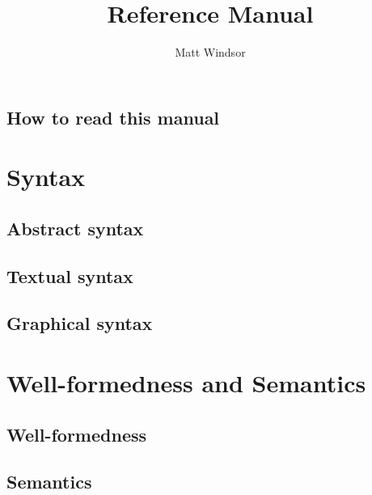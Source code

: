 \documentclass[a4paper]{memoir}
\title{\langname{} Reference Manual}
\author{Matt Windsor}
\theoremstyle{definition}
\begin{document}
\pagestyle{sruled}

\frontmatter

\begin{titlingpage}
\setlength{\droptitle}{30pt}
\maketitle
\end{titlingpage}

\tableofcontents{}

\clearpage

\chapter*{How to read this manual}


\mainmatter

\part{Syntax}

\chapter{Abstract syntax}\label{cha:metamodel}


\chapter{Textual syntax}\label{cha:textual}


\chapter{Graphical syntax}\label{cha:graphical}


\part{Well-formedness and Semantics}

\chapter{Well-formedness}\label{cha:wf}


\chapter{Semantics}\label{cha:semantics}




\end{document}
